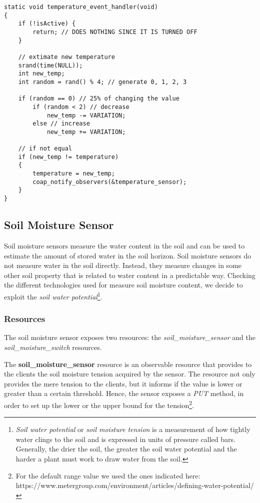\begin{lstlisting}
static void temperature_event_handler(void)
{
    if (!isActive) {
        return; // DOES NOTHING SINCE IT IS TURNED OFF
    }
    
    // extimate new temperature
    srand(time(NULL));
    int new_temp;
    int random = rand() % 4; // generate 0, 1, 2, 3
    
    if (random == 0) // 25% of changing the value
        if (random < 2) // decrease
            new_temp -= VARIATION;
        else // increase
            new_temp += VARIATION;

    // if not equal
    if (new_temp != temperature)
    {
        temperature = new_temp;
        coap_notify_observers(&temperature_sensor);
    }
}
\end{lstlisting}



\subsection{Soil Moisture Sensor}
Soil moisture sensors measure the water content in the soil and can be used to estimate the amount of stored water in the soil horizon. Soil moisture sensors do not measure water in the soil directly. Instead, they measure changes in some other soil property that is related to water content in a predictable way. Checking the different technologies used for measure soil moisture content, we decide to exploit the \textit{soil water potential}\footnote{\textit{Soil water potential} or \textit{soil moisture tension} is a measurement of how tightly water clings to the soil and is expressed in units of pressure called bars. Generally, the drier the soil, the greater the soil water potential and the harder a plant must work to draw water from the soil.}.

\subsubsection{Resources}
The soil moisture sensor exposes two resources: the \textit{soil\_moisture\_sensor} and the \textit{soil\_moisture\_switch} resources.

The \textbf{soil\_moisture\_sensor} resource is an observable resource that provides to the clients the soil moisture tension acquired by the sensor. The resource not only provides the mere tension to the clients, but it informs if the value is lower or greater than a certain threshold. Hence, the sensor exposes a  \textit{PUT} method, in order to set up the lower or the upper bound for the tension\footnote{For the default range value we used the ones indicated here: https://www.metergroup.com/environment/articles/defining-water-potential/ }.

